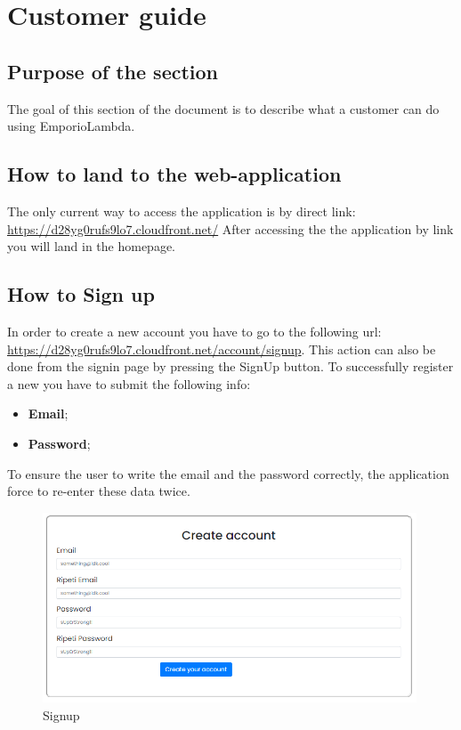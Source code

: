 \section{Customer guide} \label{_cliente}
\subsection{Purpose of the section}
The goal of this section of the document is to describe what a customer can do using EmporioLambda.

\subsection{How to land to the web-application}
The only current way to access the application is by direct link: \url{https://d28yg0rufs9lo7.cloudfront.net/}
After accessing the the application by link you will land in the homepage.

\subsection{How to Sign up} \label{_signup}
In order to create a new account you have to go to the following url: \url{https://d28yg0rufs9lo7.cloudfront.net/account/signup}. This action can also be done from the signin page by pressing the SignUp button.  To successfully register a new you have to submit the following info:
\begin{itemize} 
    \item \textbf{Email};
    \item \textbf{Password}; 
\end{itemize}
To ensure the user to write the email and the password correctly, the application force to re-enter these data twice.

\begin{figure}[H]
    \centering
    \includegraphics[width=30em]{res/images/cliente/signup.png}
    \caption{Signup}
\end{figure}

